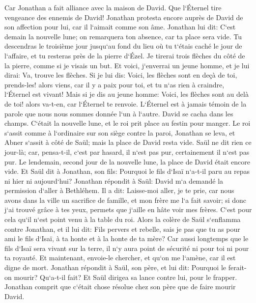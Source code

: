 \verse Car Jonathan a fait alliance avec la maison de David. Que l`Éternel tire vengeance des ennemis de David! 
\verse Jonathan protesta encore auprès de David de son affection pour lui, car il l`aimait comme son âme. 
\verse Jonathan lui dit: C`est demain la nouvelle lune; on remarquera ton absence, car ta place sera vide. 
\verse Tu descendras le troisième jour jusqu`au fond du lieu où tu t`étais caché le jour de l`affaire, et tu resteras près de la pierre d`Ézel. 
\verse Je tirerai trois flèches du côté de la pierre, comme si je visais un but. 
\verse Et voici, j`enverrai un jeune homme, et je lui dirai: Va, trouve les flèches. Si je lui dis: Voici, les flèches sont en deçà de toi, prends-les! alors viens, car il y a paix pour toi, et tu n`as rien à craindre, l`Éternel est vivant! 
\verse Mais si je dis au jeune homme: Voici, les flèches sont au delà de toi! alors va-t-en, car l`Éternel te renvoie. 
\verse L`Éternel est à jamais témoin de la parole que nous nous sommes donnée l`un à l`autre. 
\verse David se cacha dans les champs. C`était la nouvelle lune, et le roi prit place au festin pour manger. 
\verse Le roi s`assit comme à l`ordinaire sur son siège contre la paroi, Jonathan se leva, et Abner s`assit à côté de Saül; mais la place de David resta vide. 
\verse Saül ne dit rien ce jour-là; car, pensa-t-il, c`est par hasard, il n`est pas pur, certainement il n`est pas pur. 
\verse Le lendemain, second jour de la nouvelle lune, la place de David était encore vide. Et Saül dit à Jonathan, son fils: Pourquoi le fils d`Isaï n`a-t-il paru au repas ni hier ni aujourd`hui? 
\verse Jonathan répondit à Saül: David m`a demandé la permission d`aller à Bethléhem. 
\verse Il a dit: Laisse-moi aller, je te prie, car nous avons dans la ville un sacrifice de famille, et mon frère me l`a fait savoir; si donc j`ai trouvé grâce à tes yeux, permets que j`aille en hâte voir mes frères. C`est pour cela qu`il n`est point venu à la table du roi. 
\verse Alors la colère de Saül s`enflamma contre Jonathan, et il lui dit: Fils pervers et rebelle, sais je pas que tu as pour ami le fils d`Isaï, à ta honte et à la honte de ta mère? 
\verse Car aussi longtemps que le fils d`Isaï sera vivant sur la terre, il n`y aura point de sécurité ni pour toi ni pour ta royauté. Et maintenant, envoie-le chercher, et qu`on me l`amène, car il est digne de mort. 
\verse Jonathan répondit à Saül, son père, et lui dit: Pourquoi le ferait-on mourir? Qu`a-t-il fait? 
\verse Et Saül dirigea sa lance contre lui, pour le frapper. Jonathan comprit que c`était chose résolue chez son père que de faire mourir David. 
